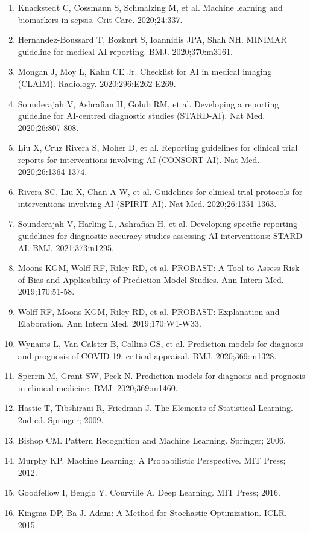 \documentclass[11pt]{article}
\begin{document}
\begin{enumerate}
\item Knackstedt C, Cossmann S, Schmalzing M, et al. Machine learning and biomarkers in sepsis. Crit Care. 2020;24:337.
\item Hernandez-Boussard T, Bozkurt S, Ioannidis JPA, Shah NH. MINIMAR guideline for medical AI reporting. BMJ. 2020;370:m3161.
\item Mongan J, Moy L, Kahn CE Jr. Checklist for AI in medical imaging (CLAIM). Radiology. 2020;296:E262-E269.
\item Sounderajah V, Ashrafian H, Golub RM, et al. Developing a reporting guideline for AI-centred diagnostic studies (STARD-AI). Nat Med. 2020;26:807-808.
\item Liu X, Cruz Rivera S, Moher D, et al. Reporting guidelines for clinical trial reports for interventions involving AI (CONSORT-AI). Nat Med. 2020;26:1364-1374.
\item Rivera SC, Liu X, Chan A-W, et al. Guidelines for clinical trial protocols for interventions involving AI (SPIRIT-AI). Nat Med. 2020;26:1351-1363.
\item Sounderajah V, Harling L, Ashrafian H, et al. Developing specific reporting guidelines for diagnostic accuracy studies assessing AI interventions: STARD-AI. BMJ. 2021;373:n1295.
\item Moons KGM, Wolff RF, Riley RD, et al. PROBAST: A Tool to Assess Risk of Bias and Applicability of Prediction Model Studies. Ann Intern Med. 2019;170:51-58.
\item Wolff RF, Moons KGM, Riley RD, et al. PROBAST: Explanation and Elaboration. Ann Intern Med. 2019;170:W1-W33.
\item Wynants L, Van Calster B, Collins GS, et al. Prediction models for diagnosis and prognosis of COVID-19: critical appraisal. BMJ. 2020;369:m1328.
\item Sperrin M, Grant SW, Peek N. Prediction models for diagnosis and prognosis in clinical medicine. BMJ. 2020;369:m1460.
\item Hastie T, Tibshirani R, Friedman J. The Elements of Statistical Learning. 2nd ed. Springer; 2009.
\item Bishop CM. Pattern Recognition and Machine Learning. Springer; 2006.
\item Murphy KP. Machine Learning: A Probabilistic Perspective. MIT Press; 2012.
\item Goodfellow I, Bengio Y, Courville A. Deep Learning. MIT Press; 2016.
\item Kingma DP, Ba J. Adam: A Method for Stochastic Optimization. ICLR. 2015.

\end{enumerate}
\end{document}
